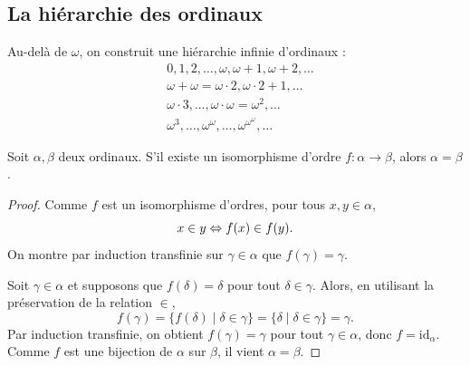 \subsection{La hiérarchie des ordinaux}

Au-delà de $\omega$, on construit une hiérarchie infinie d'ordinaux :
\begin{align*}
	 & 0, 1, 2, \ldots, \omega, \omega + 1, \omega + 2, \ldots                 \\
	 & \omega + \omega = \omega \cdot 2, \omega \cdot 2 + 1, \ldots            \\
	 & \omega \cdot 3, \ldots, \omega \cdot \omega = \omega^2, \ldots          \\
	 & \omega^3, \ldots, \omega^\omega, \ldots, \omega^{\omega^\omega}, \ldots
\end{align*}

\begin{proposition}\label{ens : ordinal : iso_entre_ordinaux}
    Soit $\alpha, \beta$ deux ordinaux. S'il existe un isomorphisme d'ordre $f:\alpha\to \beta$, alors $\alpha = \beta$.
\end{proposition}
\begin{proof}
Comme $f$ est un isomorphisme d'ordres, pour tous $x,y\in\alpha$,
\[
x\in y \Leftrightarrow f(x)\in f(y).
\]
On montre par induction transfinie sur $\gamma\in\alpha$ que $f(\gamma)=\gamma$.

Soit $\gamma\in\alpha$ et supposons que $f(\delta)=\delta$ pour tout $\delta\in\gamma$. 
Alors, en utilisant la préservation de la relation $\in$,
\[
f(\gamma)
= \{ f(\delta) \mid \delta\in\gamma \}
= \{ \delta \mid \delta\in\gamma \}
= \gamma.
\]
Par induction transfinie, on obtient $f(\gamma)=\gamma$ pour tout $\gamma\in\alpha$, 
donc $f=\mathrm{id}_\alpha$. 
Comme $f$ est une bijection de $\alpha$ sur $\beta$, il vient $\alpha=\beta$.
\end{proof}

